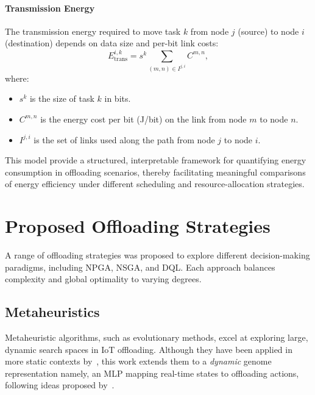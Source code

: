 \documentclass[preprint,3p,authoryear]{elsarticle}
\begin{document}
\paragraph{Transmission Energy}
The transmission energy required to move task \(k\) from node \(j\) (source) to node \(i\) (destination) depends on data size and per-bit link costs:
\begin{equation}
E_{\text{trans}}^{i,k} = s^{k} \sum_{(m,n) \in I^{j,i}} C^{m,n},
\end{equation}
where:
\begin{itemize}
    \item \(s^{k}\) is the size of task \(k\) in bits.
    \item \(C^{m,n}\) is the energy cost per bit (J/bit) on the link from node \(m\) to node \(n\).
    \item \(I^{j,i}\) is the set of links used along the path from node \(j\) to node \(i\).
\end{itemize}

This model provide a structured, interpretable framework for quantifying energy consumption in offloading scenarios, thereby facilitating meaningful comparisons of energy efficiency under different scheduling and resource-allocation strategies.


\section{Proposed Offloading Strategies}\label{sec:offloading_strategies}


A range of offloading strategies was proposed to explore different decision-making paradigms, including NPGA, NSGA, and DQL. Each approach balances complexity and global optimality to varying degrees.

\subsection{Metaheuristics}\label{subsec:metaheuristics}

Metaheuristic algorithms, such as evolutionary methods, excel at exploring large, dynamic search spaces in IoT offloading. Although they have been applied in more static contexts by~\cite{bernard_d-npga_2024}, this work extends them to a \emph{dynamic} genome representation namely, an MLP mapping real-time states to offloading actions, following ideas proposed by~\cite{such2018deepneuroevolutiongeneticalgorithms}.

    
\end{document}

